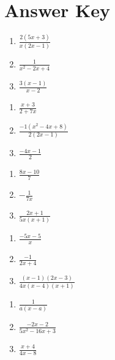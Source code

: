 \newpage

\section{Answer Key}

\begin{multicols}{3}
\begin{enumerate}
\item $\frac{2(5x+3)}{x(2x-1)}$
\item $\frac{1}{x^2-2x+4}$
\item $\frac{3(x-1)}{x-2}$
\end{enumerate}	\setcounter{Review}{\value{enumi}}
\end{multicols}
\smallskip
\begin{multicols}{3}
\begin{enumerate}	\setcounter{enumi}{\value{Review}}
\item $\frac{x+3}{2+7x}$
\item $\frac{-1(x^2-4x+8)}{2(2x-1)}$
\item $\frac{-4x-1}{2}$
\end{enumerate}	\setcounter{Review}{\value{enumi}}
\end{multicols}
\smallskip
\begin{multicols}{3}
\begin{enumerate}	\setcounter{enumi}{\value{Review}}
\item $\frac{8x-10}{7}$
\item $-\frac{1}{7x}$
\item $\frac{2x+1}{5x(x+1)}$
\end{enumerate}	\setcounter{Review}{\value{enumi}}
\end{multicols}
\smallskip
\begin{multicols}{3}
\begin{enumerate}	\setcounter{enumi}{\value{Review}}
\item $\frac{-5x-5}{x}$
\item $\frac{-1}{2x+4}$
\item $\frac{(x-1)(2x-3)}{4x(x-4)(x+1)}$
\end{enumerate}	\setcounter{Review}{\value{enumi}}
\end{multicols}
\smallskip
\begin{multicols}{3}
\begin{enumerate}	\setcounter{enumi}{\value{Review}}
\item $\frac{1}{a(x-a)}$
\item $\frac{-2x-2}{5x^2-16x+3}$
\item $\frac{x+4}{4x-8}$
\end{enumerate}
\end{multicols}